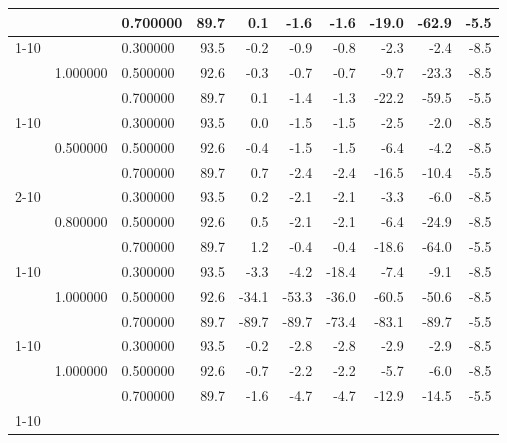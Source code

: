 \begin{tabular}{lllrrrrrrr}
 &  & 0.700000 & 89.7 & 0.1 & -1.6 & -1.6 & -19.0 & -62.9 & -5.5 \\
\cline{1-10} \cline{2-10}
\multirow[t]{3}{*}{llm:semantic\_negation} & \multirow[t]{3}{*}{1.000000} & 0.300000 & 93.5 & -0.2 & -0.9 & -0.8 & -2.3 & -2.4 & -8.5 \\
 &  & 0.500000 & 92.6 & -0.3 & -0.7 & -0.7 & -9.7 & -23.3 & -8.5 \\
 &  & 0.700000 & 89.7 & 0.1 & -1.4 & -1.3 & -22.2 & -59.5 & -5.5 \\
\cline{1-10} \cline{2-10}
\multirow[t]{6}{*}{partial} & \multirow[t]{3}{*}{0.500000} & 0.300000 & 93.5 & 0.0 & -1.5 & -1.5 & -2.5 & -2.0 & -8.5 \\
 &  & 0.500000 & 92.6 & -0.4 & -1.5 & -1.5 & -6.4 & -4.2 & -8.5 \\
 &  & 0.700000 & 89.7 & 0.7 & -2.4 & -2.4 & -16.5 & -10.4 & -5.5 \\
\cline{2-10}
 & \multirow[t]{3}{*}{0.800000} & 0.300000 & 93.5 & 0.2 & -2.1 & -2.1 & -3.3 & -6.0 & -8.5 \\
 &  & 0.500000 & 92.6 & 0.5 & -2.1 & -2.1 & -6.4 & -24.9 & -8.5 \\
 &  & 0.700000 & 89.7 & 1.2 & -0.4 & -0.4 & -18.6 & -64.0 & -5.5 \\
\cline{1-10} \cline{2-10}
\multirow[t]{3}{*}{sleeper} & \multirow[t]{3}{*}{1.000000} & 0.300000 & 93.5 & -3.3 & -4.2 & -18.4 & -7.4 & -9.1 & -8.5 \\
 &  & 0.500000 & 92.6 & -34.1 & -53.3 & -36.0 & -60.5 & -50.6 & -8.5 \\
 &  & 0.700000 & 89.7 & -89.7 & -89.7 & -73.4 & -83.1 & -89.7 & -5.5 \\
\cline{1-10} \cline{2-10}
\multirow[t]{3}{*}{uninformative} & \multirow[t]{3}{*}{1.000000} & 0.300000 & 93.5 & -0.2 & -2.8 & -2.8 & -2.9 & -2.9 & -8.5 \\
 &  & 0.500000 & 92.6 & -0.7 & -2.2 & -2.2 & -5.7 & -6.0 & -8.5 \\
 &  & 0.700000 & 89.7 & -1.6 & -4.7 & -4.7 & -12.9 & -14.5 & -5.5 \\
\cline{1-10} \cline{2-10}
\bottomrule
\end{tabular}

